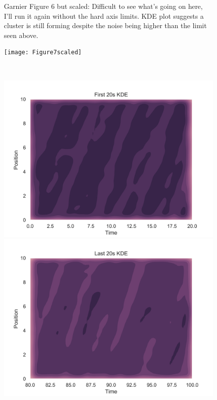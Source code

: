 \documentclass[11pt,a4paper, final, dvipsnames]{article}
\begin{document}
\begin{figure}
\begin{minipage}[b]{0.49\textwidth}
    \end{minipage}
    \caption{Garnier Figure 6 but scaled: Difficult to see what's going on here, I'll run it again without the hard axis limits. KDE plot suggests a cluster is still forming despite the noise being higher than the limit seen above.}
\end{figure}

    \begin{figure}
    \centering
    \begin{minipage}[b]{\textwidth}
        \centering
        
        \texttt{[image: Figure7scaled]}
    \end{minipage} \\
    
    \begin{minipage}[b]{0.49\textwidth}
        \centering
        \includegraphics[width=\textwidth]{Figure7bscaled}
    \end{minipage} %
    \begin{minipage}[b]{0.49\textwidth}
        \centering                    
        \includegraphics[width=\textwidth]{Figure7dscaled}

\end{minipage}
\end{figure}
\end{document}
